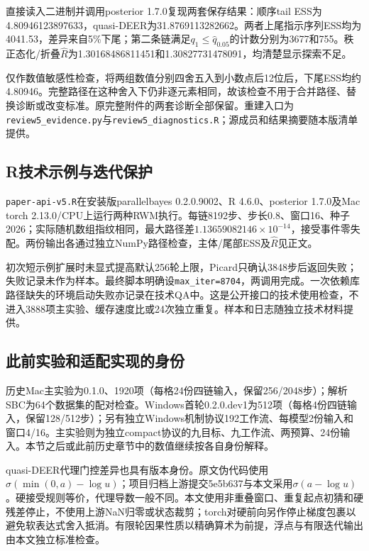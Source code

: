 直接读入二进制并调用posterior 1.7.0复现两套保存结果：顺序tail ESS为4.80946123897633，quasi-DEER为31.8769113282662。两者上尾指示序列ESS均为4041.53，差异来自5\%下尾；第二条链满足$q_1\leq\widehat q_{0.05}$的计数分别为3677和755。秩正态化/折叠$\hat R$为1.30168486811451和1.30827731478091，均清楚显示探索不足。

仅作数值敏感性检查，将两组数值分别四舍五入到小数点后12位后，下尾ESS均约4.80946。完整路径在这种舍入下仍非逐元素相同，故该检查不用于合并路径、替换诊断或改变标准。原完整附件的两套诊断全部保留。重建入口为\texttt{review5\_evidence.py}与\texttt{review5\_diagnostics.R}；源成员和结果摘要随本版清单提供。

\subsection{R技术示例与迭代保护}
\texttt{paper-api-v5.R}在安装版parallelbayes 0.2.0.9002、R 4.6.0、posterior 1.7.0及Mac torch 2.13.0/CPU上运行两种RWM执行。每链8192步、步长0.8、窗口16、种子2026；实际随机数组指纹相同，最大路径差$1.13659082146\times10^{-14}$，接受事件零失配。两份输出各通过独立NumPy路径检查，主体/尾部ESS及$\hat R$见正文。

初次短示例扩展时未显式提高默认256轮上限，Picard只确认3848步后返回失败；失败记录未作为样本。最终脚本明确设\texttt{max\_iter=8704}，两调用完成。一次依赖库路径缺失的环境启动失败亦记录在技术QA中。这是公开接口的技术使用检查，不进入3888项主实验、缓存速度比或24次独立重复。样本和日志随独立技术材料提供。

\subsection{此前实验和适配实现的身份}
历史Mac主实验为0.1.0、1920项（每格24份四链输入，保留256/2048步）；解析SBC为64个数据集的配对检查。Windows首轮0.2.0.dev1为512项（每格4份四链输入，保留128/512步）；另有独立Windows机制协议192工作流、每模型2份输入和窗口4/16。主实验则为独立compact协议的九目标、九工作流、两预算、24份输入。本节之后或此前历史章节中的数值继续按各自身份解释。

quasi-DEER代理门控差异也具有版本身份。原文伪代码使用$\sigma(\min(0,a)-\log u)$；项目归档上游提交5e5b637与本文采用$\sigma(a-\log u)$。硬接受规则等价，代理导数一般不同。本文使用非重叠窗口、重复起点初猜和硬残差停止，不使用上游NaN归零或状态裁剪；torch对硬前向另作停止梯度包裹以避免软表达式舍入抵消。有限轮因果性质以精确算术为前提，浮点与有限迭代输出由本文独立标准检查。
